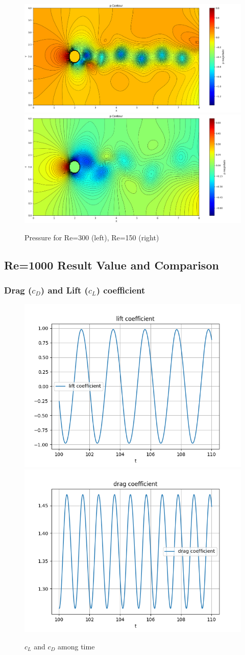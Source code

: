 \documentclass[12pt]{article}
\begin{document}
\begin{figure}[H]
    \centering
    \includegraphics[width=0.45\linewidth]{figure/N32_Re1000_8x4_t100/p_N32_Re1000_8x4_t100.jpg}
    \includegraphics[width=0.45\linewidth]{figure/N32_Re150_8x4_t100/p_N32_Re150_8x4_t100.jpg}
    \caption{Pressure for Re=300 (left), Re=150 (right)}
\end{figure}

















\subsection{Re=1000 Result Value and Comparison}

\subsubsection{Drag ($c_D$) and Lift ($c_L$) coefficient}

\begin{figure}[H]
    \centering
    \includegraphics[width=0.45\linewidth]{figure/Analysis/N32_Re1000_8x4/cl_N32_Re1000_8x4.jpg}
    \includegraphics[width=0.45\linewidth]{figure/Analysis/N32_Re1000_8x4/cd_N32_Re1000_8x4.jpg}
    \caption{$c_L$ and $c_D$ among time}
\end{figure}
\end{document}
